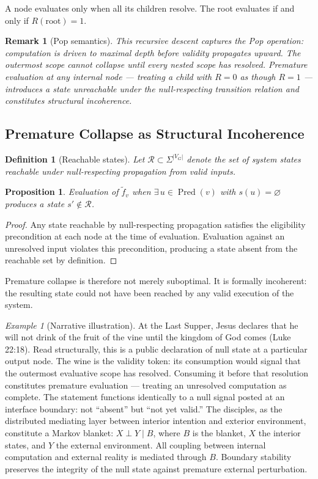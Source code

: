 \documentclass[11pt]{article}
\newtheorem{definition}{Definition}
\newtheorem{proposition}{Proposition}
\newtheorem{remark}{Remark}
\theoremstyle{remark}
\newtheorem*{example*}{Example}
\begin{document}
A node evaluates only when all its children resolve. The root evaluates if and only if $R(\text{root}) = 1$.

\begin{remark}[Pop semantics]
This recursive descent captures the Pop operation: computation is driven to maximal depth before validity propagates upward. The outermost scope cannot collapse until every nested scope has resolved. Premature evaluation at any internal node — treating a child with $R = 0$ as though $R = 1$ — introduces a state unreachable under the null-respecting transition relation and constitutes structural incoherence.
\end{remark}

\subsection{Premature Collapse as Structural Incoherence}

\begin{definition}[Reachable states]
Let $\mathcal{R} \subset \Sigma^{|V_G|}$ denote the set of system states reachable under null-respecting propagation from valid inputs.
\end{definition}

\begin{proposition}
Evaluation of $\tilde{f}_v$ when $\exists\, u \in \operatorname{Pred}(v)$ with $s(u) = \varnothing$ produces a state $s' \notin \mathcal{R}$.
\end{proposition}

\begin{proof}
Any state reachable by null-respecting propagation satisfies the eligibility precondition at each node at the time of evaluation. Evaluation against an unresolved input violates this precondition, producing a state absent from the reachable set by definition.
\end{proof}

Premature collapse is therefore not merely suboptimal. It is formally incoherent: the resulting state could not have been reached by any valid execution of the system.

\begin{example*}[Narrative illustration]
At the Last Supper, Jesus declares that he will not drink of the fruit of the vine until the kingdom of God comes (Luke 22:18). Read structurally, this is a public declaration of null state at a particular output node. The wine is the validity token: its consumption would signal that the outermost evaluative scope has resolved. Consuming it before that resolution constitutes premature evaluation — treating an unresolved computation as complete. The statement functions identically to a null signal posted at an interface boundary: not ``absent'' but ``not yet valid.'' The disciples, as the distributed mediating layer between interior intention and exterior environment, constitute a Markov blanket: $X \perp Y \mid B$, where $B$ is the blanket, $X$ the interior states, and $Y$ the external environment. All coupling between internal computation and external reality is mediated through $B$. Boundary stability preserves the integrity of the null state against premature external perturbation.
\end{example*}
\end{document}

